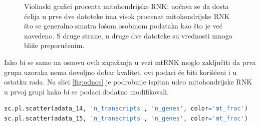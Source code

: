 \documentclass{article}
\begin{document}
\begin{figure}[H]
    \centering
    \caption{ Violinski grafici procenta mitohondrijske RNK: uočava se da dosta ćelija u prve dve datoteke ima visok procenat mitohondrijske RNK što se generalno smatra lošom osobinom podataka kao što je već navedeno. S druge strane, u druge dve datoteke su vrednosti mnogo bliže preporučenim. }
    \label{fig:n_counts_violin}
\end{figure}

Iako bi se samo na osnovu ovih zapažanja u vezi mtRNK moglo zaključiti da prva grupa uzoraka nema dovoljno dobar kvalitet, ovi podaci će biti korišćeni i u ostatku rada. Na slici \ref{fig:odnos} je podrobnije ispitan udeo mitohondrijske RNK u prvoj grupi kako bi se podaci dodatno modifikovali.

\begin{lstlisting}[language=python]
sc.pl.scatter(adata_14, 'n_transcripts', 'n_genes', color='mt_frac')
sc.pl.scatter(adata_15, 'n_transcripts', 'n_genes', color='mt_frac')
\end{lstlisting}
\end{document}
